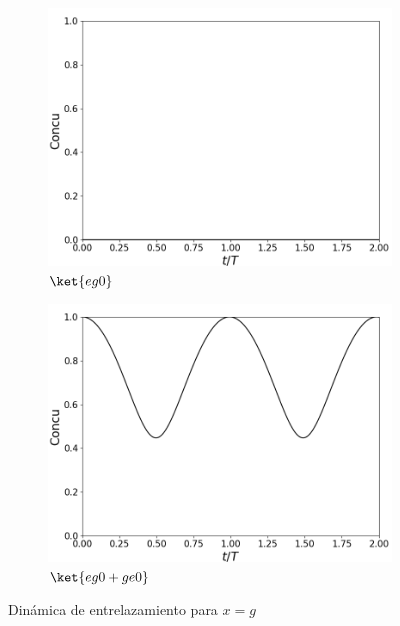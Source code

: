 \begin{figure}[h]
    \centering
    \begin{subfigure}{0.49\textwidth}
        \includegraphics[width=\textwidth]{figuras/ch4/x eg0 concu.png}
        \caption{$\ket{eg0}$}
        \label{fig4:concu x eg0}
    \end{subfigure}
    \hfill
    \begin{subfigure}{0.49\textwidth}
        \includegraphics[width=\textwidth]{figuras/ch4/x eg0+ concu.png}
        \caption{$\ket{eg0+ge0}$}
        \label{fig4:concu x eg0 sim}
    \end{subfigure}
    \caption{Dinámica de entrelazamiento para $x=g$}
    \label{fig4:concu x}
\end{figure}
